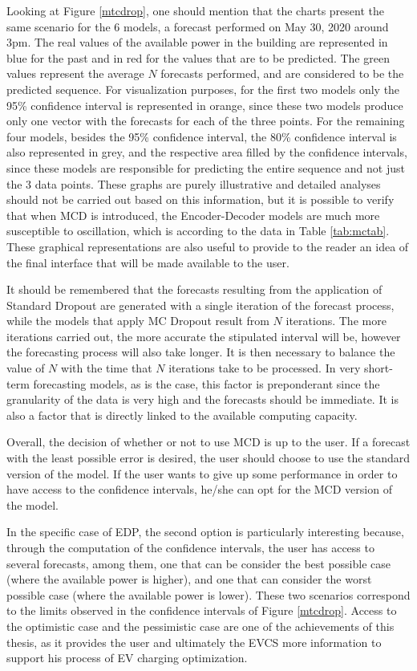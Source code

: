Looking at Figure \ref{mtcdrop}, one should mention that the charts present the same scenario for the 6 models, a forecast performed on May 30, 2020 around 3pm. The real values of the available power in the building are represented in blue for the past and in red for the values that are to be predicted. The green values represent the average $N$ forecasts performed, and are considered to be the predicted sequence. For visualization purposes, for the first two models only the 95\% confidence interval is represented in orange, since these two models produce only one vector with the forecasts for each of the three points. For the remaining four models, besides the 95\% confidence interval, the 80\% confidence interval is also represented in grey, and the respective area filled by the confidence intervals, since these models are responsible for predicting the entire sequence and not just the 3 data points. These graphs are purely illustrative and detailed analyses should not be carried out based on this information, but it is possible to verify that when \ac{MCD} is introduced, the Encoder-Decoder models are much more susceptible to oscillation, which is according to the data in Table \ref{tab:mctab}. These graphical representations are also useful to provide to the reader an idea of the final interface that will be made available to the user. 

It should be remembered that the forecasts resulting from the application of Standard Dropout are generated with a single iteration of the forecast process, while the models that apply MC Dropout result from $N$ iterations. The more iterations carried out, the more accurate the stipulated interval will be, however the forecasting process will also take longer. It is then necessary to balance the value of $N$ with the time that $N$ iterations take to be processed. In very short-term forecasting models, as is the case, this factor is preponderant since the granularity of the data is very high and the forecasts should be immediate. It is also a factor that is directly linked to the available computing capacity.


Overall, the decision of whether or not to use MCD is up to the user. If a forecast with the least possible error is desired, the user should choose to use the standard version of the model. If the user wants to give up some performance in order to have access to the confidence intervals, he/she can opt for the MCD version of the model. 

In the specific case of \ac{EDP}, the second option is particularly interesting because, through the computation of the confidence intervals, the user has access to several forecasts, among them, one that can be consider the best possible case (where the available power is higher), and one that can consider the worst possible case (where the available power is lower). These two scenarios correspond to the limits observed in the confidence intervals of Figure \ref{mtcdrop}. Access to the optimistic case and the pessimistic case are one of the achievements of this thesis, as it provides the user and ultimately the \ac{EVCS} more information to support his process of \ac{EV} charging optimization.
